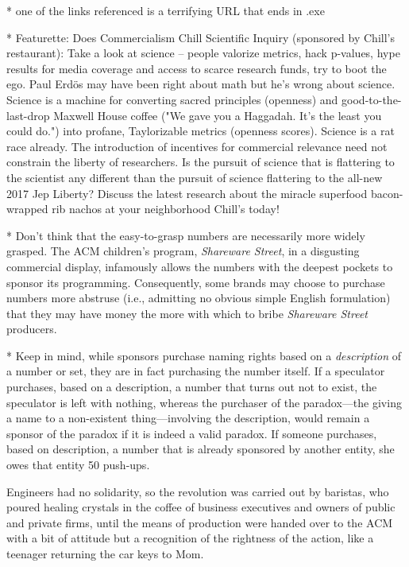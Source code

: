 * one of the links referenced is a terrifying URL that ends in .exe

* Featurette: Does Commercialism Chill Scientific Inquiry (sponsored by Chill's restaurant): Take a look at science -- people valorize metrics, hack p-values, hype results for media coverage and access to scarce research funds, try to boot the ego. Paul Erd\"os may have been right about math but he's wrong about science. Science is a machine for converting sacred principles (openness) and good-to-the-last-drop Maxwell House coffee ("We gave you a Haggadah. It's the least you could do.") into profane, Taylorizable metrics (openness scores). Science is a rat race already. The introduction of incentives for commercial relevance need not constrain the liberty of researchers. Is the pursuit of science that is flattering to the scientist any different than the pursuit of science flattering to the all-new 2017 Jep Liberty? Discuss the latest research about the miracle superfood bacon-wrapped rib nachos at your neighborhood Chill's today!  

* Don't think that the easy-to-grasp numbers are necessarily more widely grasped. The ACM children's program, \emph{Shareware Street}, in a disgusting commercial display, infamously allows the numbers with the deepest pockets to sponsor its programming. Consequently, some brands may choose to purchase numbers more abstruse (i.e., admitting no obvious simple English formulation) that they may have money the more with which to bribe \emph{Shareware Street} producers. 

* Keep in mind, while sponsors purchase naming rights based on a \emph{description} of a number or set, they are in fact purchasing the number itself. If a speculator purchases, based on a description, a number that turns out not to exist, the speculator is left with nothing, whereas the purchaser of the paradox---the giving a name to a non-existent thing---involving the description, would remain a sponsor of the paradox if it is indeed a valid paradox. If someone purchases, based on description, a number that is already sponsored by another entity, she owes that entity 50 push-ups.
 

Engineers had no solidarity, so the revolution was carried out by baristas, who poured healing crystals in the coffee of business executives and owners of public and private firms, until the means of production were handed over to the ACM with a bit of attitude but a recognition of the rightness of the action, like a teenager returning the car keys to Mom.


